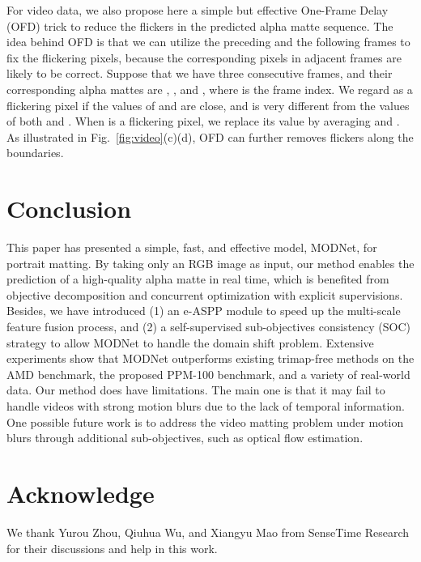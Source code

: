 \documentclass[letterpaper]{article} \usepackage{aaai22}  \usepackage{times}  \usepackage{helvet}  \usepackage{courier}  \usepackage[hyphens]{url}  \usepackage{graphicx} \urlstyle{rm} \def\UrlFont{\rm}  \usepackage{natbib}  \usepackage{caption} \usepackage{booktabs}
\begin{document}
For video data, we also propose here a simple but effective One-Frame Delay (OFD) trick to reduce the flickers in the predicted alpha matte sequence. The idea behind OFD is that we can utilize the preceding and the following frames to fix the flickering pixels, because the corresponding pixels in adjacent frames are likely to be correct.
Suppose that we have three consecutive frames, and their corresponding alpha mattes are , , and , where  is the frame index. We regard  as a flickering pixel if the values of  and  are close, and  is very different from the values of both  and . When  is a flickering pixel, we replace its value by averaging  and . As illustrated in Fig.~\ref{fig:video}(c)(d), OFD can further removes flickers along the boundaries. 








\section{Conclusion}
This paper has presented a simple, fast, and effective model, MODNet, for portrait matting. By taking only an RGB image as input, our method enables the prediction of a high-quality alpha matte in real time, which is benefited from objective decomposition and concurrent optimization with explicit supervisions. Besides, we have introduced (1) an e-ASPP module to speed up the multi-scale feature fusion process, and (2) a self-supervised sub-objectives consistency (SOC) strategy to allow MODNet to handle the domain shift problem. Extensive experiments show that MODNet outperforms existing trimap-free methods on the AMD benchmark, the proposed PPM-100 benchmark, and a variety of real-world data. Our method does have limitations. The main one is that it may fail to handle videos with strong motion blurs due to the lack of temporal information. One possible future work is to address the video matting problem under motion blurs through additional sub-objectives, such as optical flow estimation. 

\section{Acknowledge}
We thank Yurou Zhou, Qiuhua Wu, and Xiangyu Mao from SenseTime Research for their discussions and help in this work.
\end{document}
